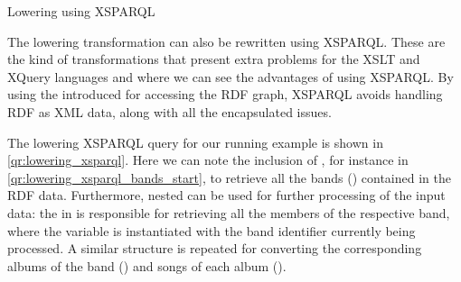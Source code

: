 \begin{query}[t]
  \caption{Lowering using XSPARQL}%
  \label{qr:lowering_xsparql}%
\end{query}
%
The lowering transformation can also be rewritten using XSPARQL.  These are the kind of transformations that present
extra problems for the \ac{XSLT} and XQuery languages and where we can see the advantages of using XSPARQL.  By using the
introduced  for accessing the \ac{RDF} graph, XSPARQL avoids handling \ac{RDF} as \ac{XML} data,
along with all the encapsulated issues.
%
\begin{example}
  The lowering XSPARQL query for our running example is shown in \cref{qr:lowering_xsparql}. Here we can note the
  inclusion of , for instance in \cref{qr:lowering_xsparql_bands_start}, to retrieve all the
  bands () contained in the \ac{RDF} data.
  Furthermore, nested  can be used for further processing of the input data: the \SparqlForClause in
   is responsible for retrieving all
  the members of the respective band, where the  variable is instantiated with the band identifier
  currently being processed.
  A similar structure is repeated for converting the corresponding albums of the band
  () and songs of each album
  ().
\end{example}




